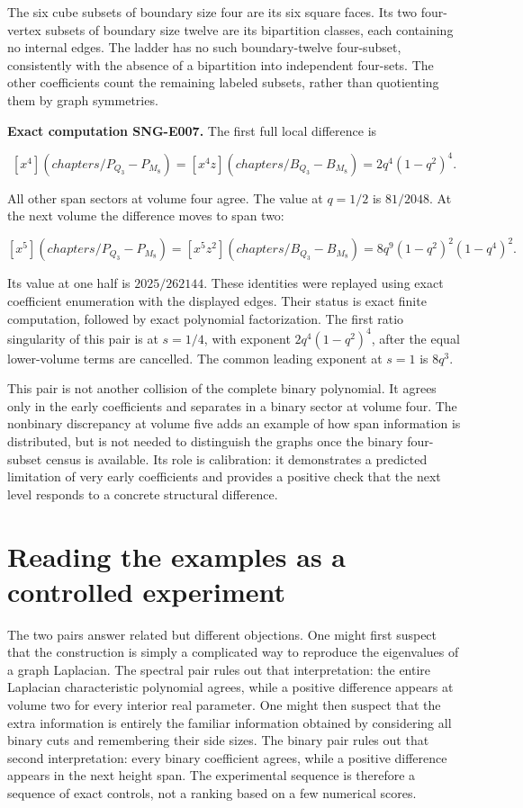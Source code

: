 \documentclass[
  11pt,
  a4paper,
]{report}
\begin{document}
The six cube subsets of boundary size four are its six square faces. Its
two four-vertex subsets of boundary size twelve are its bipartition
classes, each containing no internal edges. The ladder has no such
boundary-twelve four-subset, consistently with the absence of a
bipartition into independent four-sets. The other coefficients count the
remaining labeled subsets, rather than quotienting them by graph
symmetries.

\textbf{Exact computation SNG-E007.} The first full local difference is

\[
[x^4](chapters/P_{Q_3}-P_{M_8})
=[x^4z](chapters/B_{Q_3}-B_{M_8})
=\boxed{2q^4(1-q^2)^4}.
\]

All other span sectors at volume four agree. The value at \(q=1/2\) is
\(81/2048\). At the next volume the difference moves to span two:

\[
[x^5](chapters/P_{Q_3}-P_{M_8})
=[x^5z^2](chapters/B_{Q_3}-B_{M_8})
=\boxed{8q^9(1-q^2)^2(1-q^4)^2}.
\]

Its value at one half is \(2025/262144\). These identities were replayed
using exact coefficient enumeration with the displayed edges. Their
status is exact finite computation, followed by exact polynomial
factorization. The first ratio singularity of this pair is at \(s=1/4\),
with exponent \(2q^4(1-q^2)^4\), after the equal lower-volume terms are
cancelled. The common leading exponent at \(s=1\) is \(8q^3\).

This pair is not another collision of the complete binary polynomial. It
agrees only in the early coefficients and separates in a binary sector
at volume four. The nonbinary discrepancy at volume five adds an example
of how span information is distributed, but is not needed to distinguish
the graphs once the binary four-subset census is available. Its role is
calibration: it demonstrates a predicted limitation of very early
coefficients and provides a positive check that the next level responds
to a concrete structural difference.

\hypertarget{reading-the-examples-as-a-controlled-experiment}{%
\section{Reading the examples as a controlled
experiment}\label{reading-the-examples-as-a-controlled-experiment}}

The two pairs answer related but different objections. One might first
suspect that the construction is simply a complicated way to reproduce
the eigenvalues of a graph Laplacian. The spectral pair rules out that
interpretation: the entire Laplacian characteristic polynomial agrees,
while a positive difference appears at volume two for every interior
real parameter. One might then suspect that the extra information is
entirely the familiar information obtained by considering all binary
cuts and remembering their side sizes. The binary pair rules out that
second interpretation: every binary coefficient agrees, while a positive
difference appears in the next height span. The experimental sequence is
therefore a sequence of exact controls, not a ranking based on a few
numerical scores.
\end{document}
